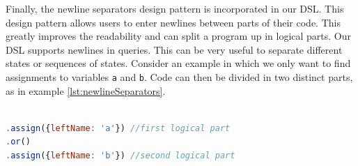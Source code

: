 Finally, the newline separators design pattern is incorporated in our DSL. This design pattern allows users to enter newlines between parts of their code. This greatly improves the readability and can split a program up in logical parts. Our DSL supports newlines in queries. This can be very useful to separate different states or sequences of states. Consider an example in which we only want to find assignments to variables \texttt{a} and \texttt{b}. Code can then be divided in two distinct parts, as in example \ref{lst:newlineSeparators}.

\begin{lstlisting}[label={lst:newlineSeparators},language=JavaScript,caption=Newline separators,mathescape=true]  % float=t?

.assign({leftName: 'a'}) //first logical part
.or()
.assign({leftName: 'b'}) //second logical part
\end{lstlisting}

